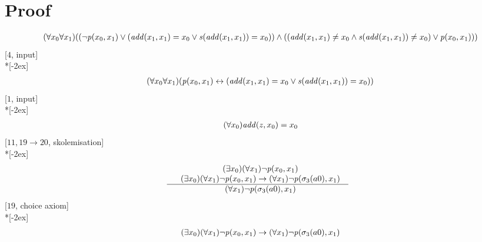 \documentclass[fleqn]{article}
\newenvironment{VampireProof}{%
   \section{Proof}}{}
\newenvironment{VampireInference}{%
   \begin{array}{c}}{\end{array}}
\newenvironment{VampirePremise}%
   {\begin{array}{l}}%
   {\end{array}}
\newenvironment{VampireConclusion}%
   {\begin{array}{l}}%
   {\end{array}}
\newcommand{\VPremiseSeparator}{\\}
\newcommand{\VConclusionSeparator}{\\ \hline}
\newcommand{\Vor}{\vee}
\newcommand{\Vand}{\wedge}
\newcommand{\Vimp}{\rightarrow}
\newcommand{\Viff}{\leftrightarrow}
\begin{document}
\begin{VampireProof}
\[\begin{VampireInference}
\begin{VampireConclusion}
~~(\forall x_{0} \forall x_{1} )((\neg \mathit{p} (x_{0},x_{1}) \Vor (\mathit{add} (x_{1},x_{1}) = x_{0} \Vor \mathit{s} (\mathit{add} (x_{1},x_{1})) = x_{0})) \Vand ((\mathit{add} (x_{1},x_{1}) \neq x_{0} \Vand \mathit{s} (\mathit{add} (x_{1},x_{1})) \neq x_{0}) \Vor \mathit{p} (x_{0},x_{1})))
\end{VampireConclusion}
\end{VampireInference}
\]
[$4$, input]\\*[-2ex]
\[\begin{VampireInference}
\begin{VampireConclusion}
~~(\forall x_{0} \forall x_{1} )(\mathit{p} (x_{0},x_{1}) \Viff (\mathit{add} (x_{1},x_{1}) = x_{0} \Vor \mathit{s} (\mathit{add} (x_{1},x_{1})) = x_{0}))
\end{VampireConclusion}
\end{VampireInference}
\]
[$1$, input]\\*[-2ex]
\[\begin{VampireInference}
\begin{VampireConclusion}
~~(\forall x_{0} )\mathit{add} (\mathit{z},x_{0}) = x_{0}
\end{VampireConclusion}
\end{VampireInference}
\]
[$11,19\rightarrow 20$, skolemisation]\\*[-2ex]
\[\begin{VampireInference}
\begin{VampirePremise}%
~~(\exists x_{0} )(\forall x_{1} )\neg \mathit{p} (x_{0},x_{1})
\end{VampirePremise}
\VPremiseSeparator
\begin{VampirePremise}%
~~(\exists x_{0} )(\forall x_{1} )\neg \mathit{p} (x_{0},x_{1}) \Vimp (\forall x_{1} )\neg \mathit{p} (\sigma_{3}(a0),x_{1})
\end{VampirePremise}
\VConclusionSeparator
\begin{VampireConclusion}
~~(\forall x_{1} )\neg \mathit{p} (\sigma_{3}(a0),x_{1})
\end{VampireConclusion}
\end{VampireInference}
\]
[$19$, choice axiom]\\*[-2ex]
\[\begin{VampireInference}
\begin{VampireConclusion}
~~(\exists x_{0} )(\forall x_{1} )\neg \mathit{p} (x_{0},x_{1}) \Vimp (\forall x_{1} )\neg \mathit{p} (\sigma_{3}(a0),x_{1})
\end{VampireConclusion}
\end{VampireInference}
\]
\end{VampireProof}
\end{document}
